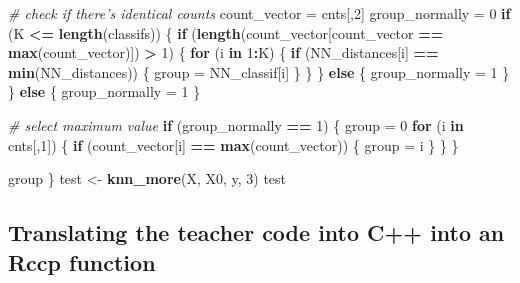 \documentclass[]{article}
\newenvironment{Shaded}{\begin{snugshade}}{\end{snugshade}}
\newcommand{\CommentTok}[1]{\textcolor[rgb]{0.56,0.35,0.01}{\textit{#1}}}
\newcommand{\ControlFlowTok}[1]{\textcolor[rgb]{0.13,0.29,0.53}{\textbf{#1}}}
\newcommand{\DecValTok}[1]{\textcolor[rgb]{0.00,0.00,0.81}{#1}}
\newcommand{\KeywordTok}[1]{\textcolor[rgb]{0.13,0.29,0.53}{\textbf{#1}}}
\newcommand{\NormalTok}[1]{#1}
\newcommand{\OperatorTok}[1]{\textcolor[rgb]{0.81,0.36,0.00}{\textbf{#1}}}
\newcommand{\StringTok}[1]{\textcolor[rgb]{0.31,0.60,0.02}{#1}}
\begin{document}
\begin{Shaded}
\begin{Highlighting}[]
  \CommentTok{# check if there's identical counts}
\NormalTok{  count_vector =}\StringTok{ }\NormalTok{cnts[,}\DecValTok{2}\NormalTok{]}
\NormalTok{  group_normally =}\StringTok{ }\DecValTok{0}
  \ControlFlowTok{if}\NormalTok{ (K }\OperatorTok{<=}\StringTok{ }\KeywordTok{length}\NormalTok{(classifs)) \{}
    \ControlFlowTok{if}\NormalTok{ (}\KeywordTok{length}\NormalTok{(count_vector[count_vector }\OperatorTok{==}\StringTok{ }\KeywordTok{max}\NormalTok{(count_vector)]) }\OperatorTok{>}\StringTok{ }\DecValTok{1}\NormalTok{) \{}
      \ControlFlowTok{for}\NormalTok{ (i }\ControlFlowTok{in} \DecValTok{1}\OperatorTok{:}\NormalTok{K) \{}
        \ControlFlowTok{if}\NormalTok{ (NN_distances[i] }\OperatorTok{==}\StringTok{ }\KeywordTok{min}\NormalTok{(NN_distances)) \{}
\NormalTok{          group =}\StringTok{ }\NormalTok{NN_classif[i]}
\NormalTok{        \}}
\NormalTok{      \}}
\NormalTok{    \} }\ControlFlowTok{else}\NormalTok{ \{}
\NormalTok{      group_normally =}\StringTok{ }\DecValTok{1}
\NormalTok{    \} }
\NormalTok{  \} }
  \ControlFlowTok{else}\NormalTok{ \{}
\NormalTok{    group_normally =}\StringTok{ }\DecValTok{1}
\NormalTok{  \}}
  
  \CommentTok{# select maximum value}
  \ControlFlowTok{if}\NormalTok{ (group_normally }\OperatorTok{==}\StringTok{ }\DecValTok{1}\NormalTok{) \{}
\NormalTok{    group =}\StringTok{ }\DecValTok{0}
    \ControlFlowTok{for}\NormalTok{ (i }\ControlFlowTok{in}\NormalTok{ cnts[,}\DecValTok{1}\NormalTok{]) \{}
      \ControlFlowTok{if}\NormalTok{ (count_vector[i] }\OperatorTok{==}\StringTok{ }\KeywordTok{max}\NormalTok{(count_vector)) \{}
\NormalTok{        group =}\StringTok{ }\NormalTok{i}
\NormalTok{      \}}
\NormalTok{    \}}
\NormalTok{  \}}

\NormalTok{  group}
\NormalTok{\}  }
\NormalTok{test <-}\StringTok{ }\KeywordTok{knn_more}\NormalTok{(X, X0, y, }\DecValTok{3}\NormalTok{)}
\NormalTok{test}
\end{Highlighting}
\end{Shaded}

\hypertarget{translating-the-teacher-code-into-c-into-an-rccp-function}{%
\subsection{Translating the teacher code into C++ into an Rccp
function}\label{translating-the-teacher-code-into-c-into-an-rccp-function}}
\end{document}
